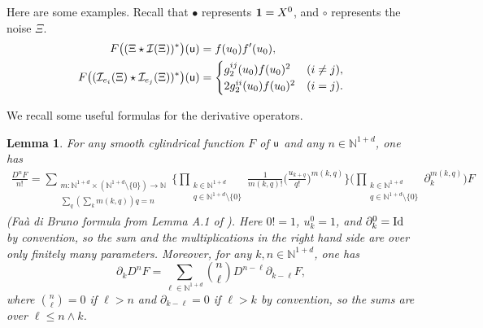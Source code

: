 \documentclass[10pt, reqno]{amsart}
\numberwithin{subsection}{section}
\numberwithin{subsubsection}{subsection}
\numberwithin{equation}{section} %
\theoremstyle{mystyle}
\newtheorem{lem}[thm]{\hspace{-0.14cm}  {Lemma} }%
\theoremstyle{mystyle2}
\theoremstyle{mystyle3}
\newcommand{\iden}{\text{\rm Id}}
\newcommand\bbN{\mathbb{N}}
\newcommand{\mcI}{\mathcal{I}}
\begin{document}
\medskip

Here are some examples. Recall that $\bullet$ represents ${\bf1}=X^0$, and $\circ$ represents the noise $\Xi$.
\begin{align*}
F\big((\Xi\star\mcI(\Xi))^*\big)({\sf u})&=f(u_0)f'(u_0),\\
F\big((\mcI_{e_i}(\Xi)\star\mcI_{e_j}(\Xi))^*\big)({\sf u})&=
\begin{cases}
g_2^{ij}(u_0)f(u_0)^2&(i\neq j),\\
2g_2^{ii}(u_0)f(u_0)^2&(i=j).
\end{cases}
\end{align*}


We recall some useful formulas for the derivative operators.

\medskip

\begin{lem}
For any smooth cylindrical function $F$ of $\sf u$ and any $n\in\bbN^{1+d}$, one has
\begin{align}\label{lem:FaadiBruno}
\frac{D^nF}{n!}=\sum_{\substack{m:\bbN^{1+d}\times(\bbN^{1+d}\setminus\{0\})\to\bbN \\ \sum_q(\sum_km(k,q))q=n}}
\bigg\{\prod_{\substack{k\in\bbN^{1+d} \\ q\in\bbN^{1+d}\setminus\{0\}}}\frac1{m(k,q)!}\Big(\frac{u_{k+q}}{q!}\Big)^{m(k,q)}\bigg\}
\bigg(\prod_{\substack{k\in\bbN^{1+d} \\ q\in\bbN^{1+d}\setminus\{0\}}}\partial_k^{m(k,q)}\bigg)F
\end{align}
(Fa\`a di Bruno formula from Lemma A.1 of \cite{BCCH18}).
Here $0!=1$, $u_k^0=1$, and $\partial_k^0=\iden$ by convention, so the sum and the multiplications in the right hand side are over only finitely many parameters.
Moreover, for any $k,n\in\bbN^{1+d}$, one has
\begin{equation}\label{lem:commutationpartialD}
\partial_kD^nF=\sum_{\ell\in\bbN^{1+d}}\binom{n}{\ell}D^{n-\ell}\partial_{k-\ell}F,
\end{equation}
where $\binom{n}{\ell}=0$ if $\ell>n$ and $\partial_{k-\ell}=0$ if $\ell>k$ by convention, so the sums are over $\ell\le n\wedge k$.
\end{lem}

\medskip
\end{document}
